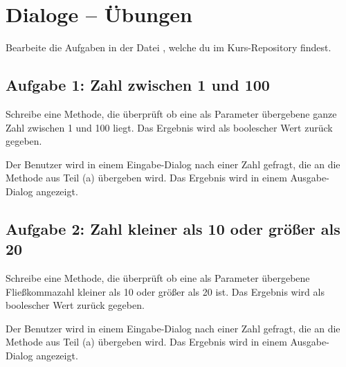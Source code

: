\clearpage

\rehead[]{\textcolor{lightblue}{AvHG, Inf, My}}
\lohead[]{\textcolor{lightblue}{AvHG, Inf, My}}

\section{Dialoge -- Übungen}

Bearbeite die Aufgaben in der Datei , welche du im
Kurs-Repository findest.

\subsection{Aufgabe 1: Zahl zwischen 1 und 100}

\begin{compactenum}[a)]
\item Schreibe eine Methode, die überprüft ob eine als Parameter übergebene
ganze Zahl zwischen 1 und 100 liegt. Das Ergebnis wird als boolescher Wert
zurück gegeben.

\item Der Benutzer wird in einem Eingabe-Dialog nach einer Zahl gefragt, die an
die Methode aus Teil (a) übergeben wird. Das Ergebnis wird in einem
Ausgabe-Dialog angezeigt.
\end{compactenum}


\subsection{Aufgabe 2: Zahl kleiner als 10 oder größer als 20}

\begin{compactenum}[a)]
\item Schreibe eine Methode, die überprüft ob eine als Parameter übergebene
 Fließkommazahl kleiner als 10 oder größer als 20 ist. Das Ergebnis wird als
 boolescher Wert zurück gegeben.

\item Der Benutzer wird in einem Eingabe-Dialog nach einer Zahl gefragt, die an
die Methode aus Teil (a) übergeben wird. Das Ergebnis wird in einem
Ausgabe-Dialog angezeigt.
\end{compactenum}


